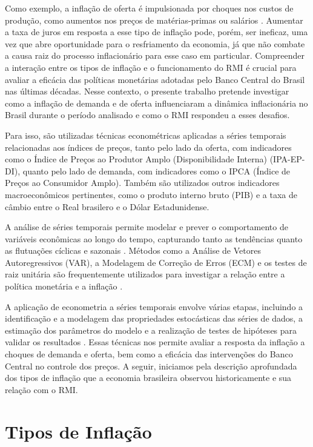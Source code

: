 \documentclass[12pt,oneside,a4paper,chapter=TITLE,english,brazil,sumario=abnt-6027-2012]{abntex2}
\begin{document}
Como exemplo, a inflação de oferta é impulsionada por choques nos custos de produção, como aumentos nos preços de matérias-primas ou salários \cite{blinder_2008_the}. Aumentar a taxa de juros em resposta a esse tipo de inflação pode, porém, ser ineficaz, uma vez que abre oportunidade para o resfriamento da economia, já que não combate a causa raiz do processo inflacionário para esse caso em particular. Compreender a interação entre os tipos de inflação e o funcionamento do RMI é crucial para avaliar a eficácia das políticas monetárias adotadas pelo Banco Central do Brasil nas últimas décadas. Nesse contexto, o presente trabalho pretende investigar como a inflação de demanda e de oferta influenciaram a dinâmica inflacionária no Brasil durante o período analisado e como o RMI respondeu a esses desafios.

Para isso, são utilizadas técnicas econométricas aplicadas a séries temporais relacionadas aos índices de preços, tanto pelo lado da oferta, com indicadores como o  Índice de Preços ao Produtor Amplo (Disponibilidade Interna) (IPA-EP-DI), quanto pelo lado de demanda, com indicadores como o IPCA (Índice de Preços ao Consumidor Amplo). Também são utilizados outros indicadores macroeconômicos pertinentes, como o produto interno bruto (PIB) e a taxa de câmbio entre o Real brasilero e o Dólar Estadunidense.

A análise de séries temporais permite modelar e prever o comportamento de variáveis econômicas ao longo do tempo, capturando tanto as tendências quanto as flutuações cíclicas e sazonais \cite{enders_2015_applied}. Métodos como a Análise de Vetores Autoregressivos (VAR), a Modelagem de Correção de Erros (ECM) e os testes de raiz unitária são frequentemente utilizados para investigar a relação entre a política monetária e a inflação \cite{hamilton_2020_time}.

A aplicação de econometria a séries temporais envolve várias etapas, incluindo a identificação e a modelagem das propriedades estocásticas das séries de dados, a estimação dos parâmetros do modelo e a realização de testes de hipóteses para validar os resultados \cite{stock_2020_introduction}. Essas técnicas nos permite avaliar a resposta da inflação a choques de demanda e oferta, bem como a eficácia das intervenções do Banco Central no controle dos preços. A seguir, iniciamos pela descrição aprofundada dos tipos de inflação que a economia brasileira observou historicamente e sua relação com o RMI.

\chapter{Tipos de Inflação}
\end{document}
